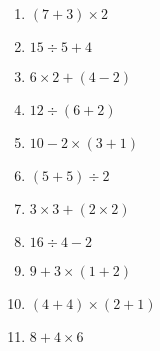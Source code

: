 \documentclass{article}
\begin{document}
\begin{enumerate}
\item  \quad \( (7 + 3) \times 2 \)
\vspace{45pt}
\hline
\vspace{5pt}

\item \quad \( 15 \div 5 + 4 \)
\vspace{45pt}
\hline
\vspace{5pt}

\item \quad \( 6 \times 2 + (4 - 2) \)
\vspace{45pt}
\hline
\vspace{5pt}

\item \quad \( 12 \div (6 + 2) \)
\vspace{45pt}
\hline
\vspace{5pt}

\item \quad \( 10 - 2 \times (3 + 1) \)
\vspace{45pt}
\hline
\vspace{5pt}

\item \quad \( (5 + 5) \div 2 \)
\vspace{45pt}
\hline
\vspace{5pt}

\item \quad \( 3 \times 3 + (2 \times 2) \)
\vspace{45pt}
\hline
\vspace{5pt}

\item \quad \( 16 \div 4 - 2 \)
\vspace{45pt}
\hline
\vspace{5pt}

\item \quad \( 9 + 3 \times (1 + 2) \)
\vspace{45pt}
\hline
\vspace{5pt}

\item \quad \( (4 + 4) \times (2 + 1) \)
\vspace{45pt} 
\vspace{5pt}

\item \quad \( 8 + 4 \times 6 \)
\vspace{45pt} 
\hline
\vspace{5pt}


\end{enumerate}
\end{document}
